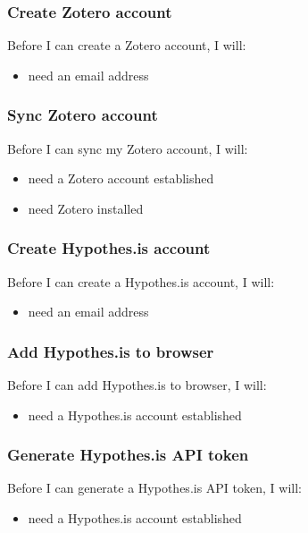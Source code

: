 \documentclass{article}
\begin{document}
\subsubsection*{Create Zotero account}

Before I can create a Zotero account, I will:
\begin{itemize}
\item need an email address
\end{itemize}

\subsubsection*{Sync Zotero account}

Before I can sync my Zotero account, I will:
\begin{itemize}
\item need a Zotero account established
\item need Zotero installed
\end{itemize}

\subsubsection*{Create Hypothes.is account}

Before I can create a Hypothes.is account, I will:
\begin{itemize}
\item need an email address
\end{itemize}

\subsubsection*{Add Hypothes.is to browser}

Before I can add Hypothes.is to browser, I will:
\begin{itemize}
\item need a Hypothes.is account established
\end{itemize}

\subsubsection*{Generate Hypothes.is API token}

Before I can generate a Hypothes.is API token, I will:
\begin{itemize}
\item need a Hypothes.is account established
\end{itemize}
\end{document}
